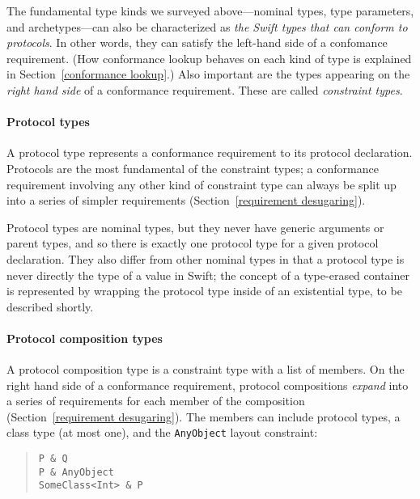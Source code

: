 \documentclass[../generics]{subfiles}
\begin{document}
\medskip

The fundamental type kinds we surveyed above---nominal types, type parameters, and archetypes---can also be characterized as  \emph{the Swift types that can conform to protocols}. In other words, they can satisfy the left-hand side of a confomance requirement. (How conformance lookup behaves on each kind of type is explained in Section~\ref{conformance lookup}.) Also important are the types appearing on the \emph{right hand side} of a conformance requirement. These are called \emph{constraint types}.

\paragraph{Protocol types}
A protocol type represents a conformance requirement to its protocol declaration. Protocols are the most fundamental of the constraint types; a conformance requirement involving any other kind of constraint type can always be split up into a series of simpler requirements (Section~\ref{requirement desugaring}).

Protocol types are nominal types, but they never have generic arguments or parent types, and so there is exactly one protocol type for a given protocol declaration. They also differ from other nominal types in that a protocol type is never directly the type of a value in Swift; the concept of a type-erased container is represented by wrapping the protocol type inside of an existential type, to be described shortly.

\paragraph{Protocol composition types}
A protocol composition type is a constraint type with a list of members. On the right hand side of a conformance requirement, protocol compositions \emph{expand} into a series of requirements for each member of the composition (Section~\ref{requirement desugaring}). The members can include protocol types, a class type (at most one), and the \texttt{AnyObject} layout constraint:
\begin{quote}
\begin{verbatim}
P & Q
P & AnyObject
SomeClass<Int> & P
\end{verbatim}
\end{quote}
\end{document}
